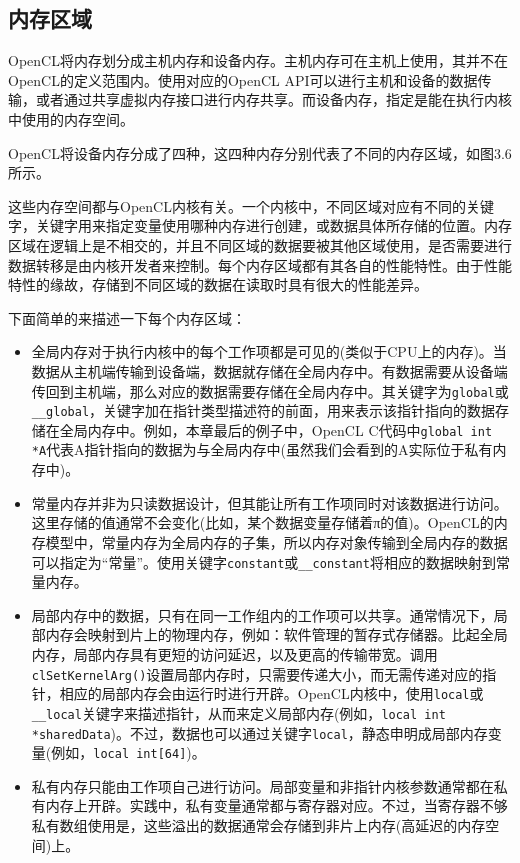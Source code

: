\subsection{内存区域}

OpenCL将内存划分成主机内存和设备内存。主机内存可在主机上使用，其并不在OpenCL的定义范围内。使用对应的OpenCL API可以进行主机和设备的数据传输，或者通过共享虚拟内存接口进行内存共享。而设备内存，指定是能在执行内核中使用的内存空间。

OpenCL将设备内存分成了四种，这四种内存分别代表了不同的内存区域，如图3.6所示。


这些内存空间都与OpenCL内核有关。一个内核中，不同区域对应有不同的关键字，关键字用来指定变量使用哪种内存进行创建，或数据具体所存储的位置。内存区域在逻辑上是不相交的，并且不同区域的数据要被其他区域使用，是否需要进行数据转移是由内核开发者来控制。每个内存区域都有其各自的性能特性。由于性能特性的缘故，存储到不同区域的数据在读取时具有很大的性能差异。

下面简单的来描述一下每个内存区域：

\begin{itemize}
\item 全局内存对于执行内核中的每个工作项都是可见的(类似于CPU上的内存)。当数据从主机端传输到设备端，数据就存储在全局内存中。有数据需要从设备端传回到主机端，那么对应的数据需要存储在全局内存中。其关键字为\texttt{global}或\texttt{\_\_global}，关键字加在指针类型描述符的前面，用来表示该指针指向的数据存储在全局内存中。例如，本章最后的例子中，OpenCL C代码中\texttt{global int *A}代表A指针指向的数据为与全局内存中(虽然我们会看到的A实际位于私有内存中)。
\item 常量内存并非为只读数据设计，但其能让所有工作项同时对该数据进行访问。这里存储的值通常不会变化(比如，某个数据变量存储着π的值)。OpenCL的内存模型中，常量内存为全局内存的子集，所以内存对象传输到全局内存的数据可以指定为“常量”。使用关键字\texttt{constant}或\texttt{\_\_constant}将相应的数据映射到常量内存。
\item 局部内存中的数据，只有在同一工作组内的工作项可以共享。通常情况下，局部内存会映射到片上的物理内存，例如：软件管理的暂存式存储器。比起全局内存，局部内存具有更短的访问延迟，以及更高的传输带宽。调用\texttt{clSetKernelArg()}设置局部内存时，只需要传递大小，而无需传递对应的指针，相应的局部内存会由运行时进行开辟。OpenCL内核中，使用\texttt{local}或\texttt{\_\_local}关键字来描述指针，从而来定义局部内存(例如，\texttt{local int *sharedData})。不过，数据也可以通过关键字\texttt{local}，静态申明成局部内存变量(例如，\texttt{local int[64]})。
\item 私有内存只能由工作项自己进行访问。局部变量和非指针内核参数通常都在私有内存上开辟。实践中，私有变量通常都与寄存器对应。不过，当寄存器不够私有数组使用是，这些溢出的数据通常会存储到非片上内存(高延迟的内存空间)上。
\end{itemize}

